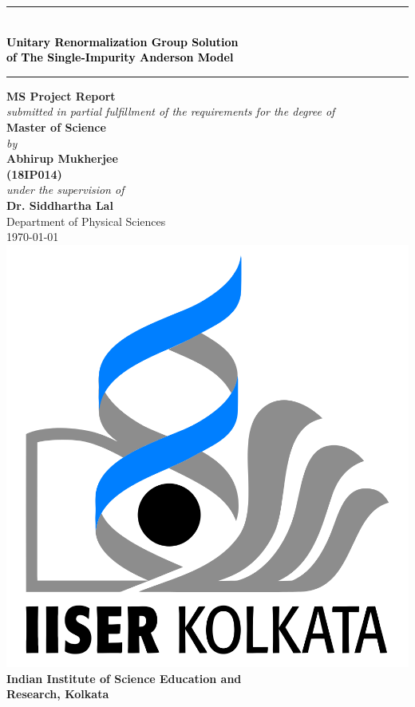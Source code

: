 \documentclass[twoside]{report}
\numberwithin{equation}{section}
\begin{document}
\begin{titlepage}
	\centering
	\rule{\textwidth}{3pt}\\
	\vspace*{25pt}
	\textcolor{black}{ %
		\textbf{\LARGE Unitary Renormalization Group Solution}\\[10pt]
		\textbf{\LARGE of The Single-Impurity Anderson Model}
	\vspace*{25pt}
	}
	\rule{\textwidth}{3pt} %
	\vfill
	{\Large \textbf{MS Project Report}}\\
	\vfill
	\textit{\large{ submitted in partial fulfillment of the requirements for the degree of }}\\
	\vfill
	{\Large \textbf{Master of Science\\}}
	\vfill
	\textit{\large by \\}
	\vfill
	{\Large \textbf{Abhirup Mukherjee \\}}
	\vspace*{5pt}
	{\Large \textbf{(18IP014)\\}}
	\vfill
	\textit{\large under the supervision of \\}
	\vfill
	{\Large \textbf{Dr. Siddhartha Lal}\\
	\vfill
	\Large Department of Physical Sciences\\
	\vfill
	\today}
	\vfill
	\includegraphics[scale=0.15]{../figures/logo.png}\\
	\vspace{0.01\textheight}
	\textbf{\Large Indian Institute of Science Education and \\[10pt]}
	\textbf{\Large Research, Kolkata}\
\end{titlepage}
\end{document}
